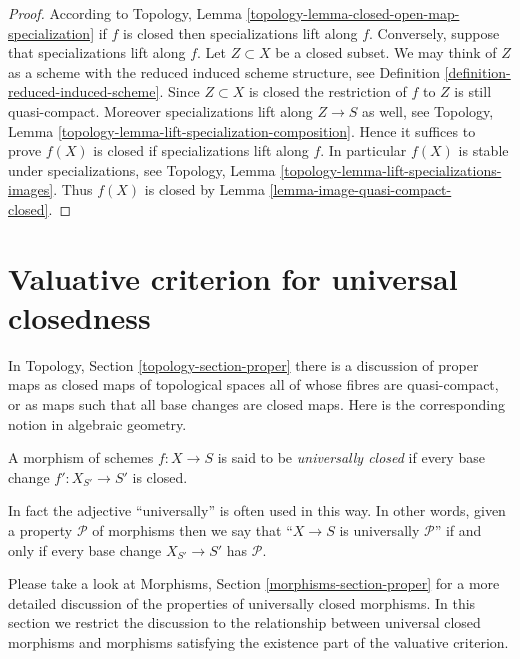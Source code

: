 \begin{proof}
According to
Topology, Lemma \ref{topology-lemma-closed-open-map-specialization}
if $f$ is closed then specializations lift along $f$.
Conversely, suppose that specializations lift along $f$.
Let $Z \subset X$ be a closed subset. We may think of $Z$
as a scheme with the reduced induced scheme structure, see
Definition \ref{definition-reduced-induced-scheme}.
Since $Z \subset X$ is closed the restriction
of $f$ to $Z$ is still quasi-compact. Moreover specializations lift
along $Z \to S$ as well,
see Topology, Lemma \ref{topology-lemma-lift-specialization-composition}.
Hence it suffices to prove $f(X)$ is closed if specializations lift along $f$.
In particular $f(X)$ is stable under specializations, see
Topology, Lemma \ref{topology-lemma-lift-specializations-images}.
Thus $f(X)$ is closed by
Lemma \ref{lemma-image-quasi-compact-closed}.
\end{proof}










\section{Valuative criterion for universal closedness}
\label{section-valuative-criterion-universal-closedness}

\noindent
In Topology, Section \ref{topology-section-proper} there is a
discussion of proper maps as closed maps of topological spaces
all of whose fibres are quasi-compact, or as maps such that
all base changes are closed maps. Here is the corresponding notion
in algebraic geometry.

\begin{definition}
\label{definition-universally-closed}
A morphism of schemes $f : X \to S$ is said to be
{\it universally closed} if every base change
$f' : X_{S'} \to S'$ is closed.
\end{definition}

\noindent
In fact the adjective ``universally'' is often used in this way.
In other words, given a property $\mathcal{P}$ of morphisms
then we say that ``$X \to S$ is universally $\mathcal{P}$''
if and only if every base change $X_{S'} \to S'$ has $\mathcal{P}$.

\medskip\noindent
Please take a look at Morphisms, Section \ref{morphisms-section-proper} for a
more detailed discussion of the properties of universally closed morphisms.
In this section we restrict the discussion to the relationship between
universal closed morphisms and morphisms satisfying the
existence part of the valuative criterion.

